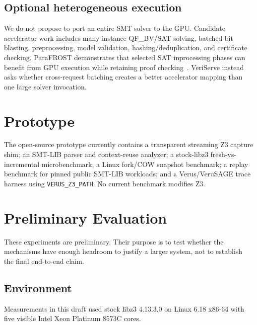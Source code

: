 \documentclass[10pt,twocolumn]{article}
\begin{document}
\subsection{Optional heterogeneous execution}
We do not propose to port an entire SMT solver to the GPU. Candidate accelerator work includes many-instance QF\_BV/SAT solving, batched bit blasting, preprocessing, model validation, hashing/deduplication, and certificate checking. ParaFROST demonstrates that selected SAT inprocessing phases can benefit from GPU execution while retaining proof checking~\cite{osama2024parafrost}. VeriServe instead asks whether cross-request batching creates a better accelerator mapping than one large solver invocation.

\section{Prototype}
The open-source prototype currently contains a transparent streaming Z3 capture shim; an SMT-LIB parser and context-reuse analyzer; a stock-libz3 fresh-vs-incremental microbenchmark; a Linux fork/COW snapshot benchmark; a replay benchmark for pinned public SMT-LIB workloads; and a Verus/VeruSAGE trace harness using \texttt{VERUS\_Z3\_PATH}. No current benchmark modifies Z3.

\section{Preliminary Evaluation}
These experiments are preliminary. Their purpose is to test whether the mechanisms have enough headroom to justify a larger system, not to establish the final end-to-end claim.

\subsection{Environment}
Measurements in this draft used stock libz3 4.13.3.0 on Linux 6.18 x86-64 with five visible Intel Xeon Platinum 8573C cores.
\end{document}
